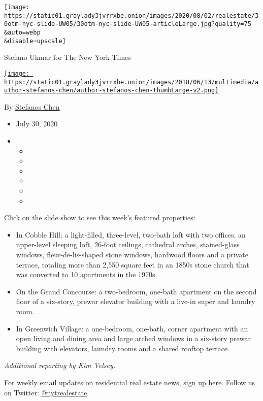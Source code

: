 \texttt{[image: https://static01.graylady3jvrrxbe.onion/images/2020/08/02/realestate/30otm-nyc-slide-UW05/30otm-nyc-slide-UW05-articleLarge.jpg?quality=75\\\&auto=webp\\\&disable=upscale]}

Stefano Ukmar for The New York Times

\href{https://www.nytimes3xbfgragh.onion/by/stefanos-chen}{\texttt{[image: https://static01.graylady3jvrrxbe.onion/images/2018/06/13/multimedia/author-stefanos-chen/author-stefanos-chen-thumbLarge-v2.png]}}

By \href{https://www.nytimes3xbfgragh.onion/by/stefanos-chen}{Stefanos
Chen}

\begin{itemize}
\item
  July 30, 2020
\item
  \begin{itemize}
  \item
  \item
  \item
  \item
  \item
  \item
  \end{itemize}
\end{itemize}

Click on the slide show to see this week's featured properties:

\begin{itemize}
\item
  In Cobble Hill: a light-filled, three-level, two-bath loft with two
  offices, an upper-level sleeping loft, 26-foot ceilings, cathedral
  arches, stained-glass windows, fleur-de-lis-shaped stone windows,
  hardwood floors and a private terrace, totaling more than 2,550 square
  feet in an 1850s stone church that was converted to 10 apartments in
  the 1970s.
\item
  On the Grand Concourse: a two-bedroom, one-bath apartment on the
  second floor of a six-story, prewar elevator building with a live-in
  super and laundry room.
\item
  In Greenwich Village: a one-bedroom, one-bath, corner apartment with
  an open living and dining area and large arched windows in a six-story
  prewar building with elevators, laundry rooms and a shared rooftop
  terrace.
\end{itemize}

\emph{Additional reporting by Kim Velsey.}

For weekly email updates on residential real estate news,
\href{http://www.nytimes3xbfgragh.onion/newsletters/realestate/}{sign up
here}. Follow us on Twitter:
\href{https://twitter.com/nytrealestate}{@nytrealestate}.

